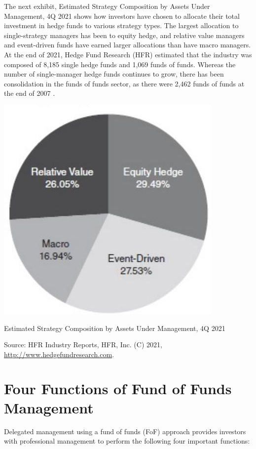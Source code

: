 \documentclass[11pt]{article}
\begin{document}
The next exhibit, Estimated Strategy Composition by Assets Under Management, 4Q 2021 shows how investors have chosen to allocate their total investment in hedge funds to various strategy types. The largest allocation to single-strategy managers has been to equity hedge, and relative value managers and event-driven funds have earned larger allocations than have macro managers. At the end of 2021, Hedge Fund Research (HFR) estimated that the industry was composed of 8,185 single hedge funds and 1,069 funds of funds. Whereas the number of single-manager hedge funds continues to grow, there has been consolidation in the funds of funds sector, as there were 2,462 funds of funds at the end of 2007 .

\begin{center}
\includegraphics[max width=\textwidth]{2024_04_09_a22e8e8765db4383bf63g-3}
\end{center}

Estimated Strategy Composition by Assets Under Management, 4Q 2021

Source: HFR Industry Reports, HFR, Inc. (C) 2021, \href{http://www.hedgefundresearch.com}{http://www.hedgefundresearch.com}.

\section*{Four Functions of Fund of Funds Management}
Delegated management using a fund of funds (FoF) approach provides investors with professional management to perform the following four important functions:
\end{document}
